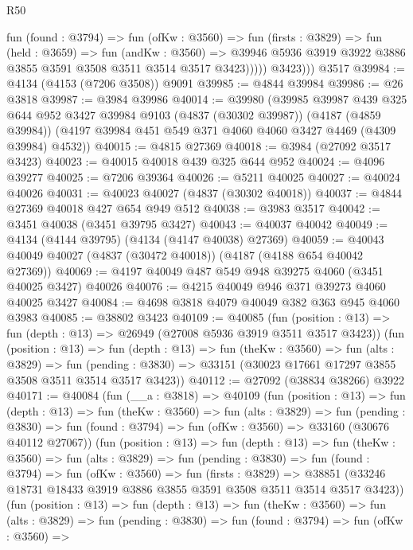 \begin{lexlean}{R50}
\begin{coremodule}
                fun (found : @3794) =>
                fun (ofKw : @3560) =>
                fun (firsts : @3829) =>
                fun (held : @3659) =>
                fun (andKw : @3560) =>
                @39946 @5936 @3919 @3922 @3886 @3855 @3591 @3508 @3511 @3514 @3517 @3423)))))
          @3423)))
    @3517
@39984 := @4134 (@4153 (@7206 @3508)) @9091
@39985 := @4844 @39984
@39986 := @26 @3818
@39987 := @3984 @39986
@40014 := @39980
    (@39985
      @39987
      @439
      @325
      @644
      @952
      @3427
      @39984
      @9103
      (@4837 (@30302 @39987))
      (@4187 (@4859 @39984))
      (@4197 @39984 @451 @549 @371 @4060 @4060 @3427 @4469 (@4309 @39984) @4532))
@40015 := @4815 @27369
@40018 := @3984 (@27092 @3517 @3423)
@40023 := @40015 @40018 @439 @325 @644 @952
@40024 := @4096 @39277
@40025 := @7206 @39364
@40026 := @5211 @40025
@40027 := @40024 @40026
@40031 := @40023 @40027 (@4837 (@30302 @40018))
@40037 := @4844 @27369 @40018 @427 @654 @949 @512
@40038 := @3983 @3517
@40042 := @3451 @40038 (@3451 @39795 @3427)
@40043 := @40037 @40042
@40049 := @4134 (@4144 @39795) (@4134 (@4147 @40038) @27369)
@40059 := @40043 @40049 @40027 (@4837 (@30472 @40018)) (@4187 (@4188 @654 @40042 @27369))
@40069 := @4197 @40049 @487 @549 @948 @39275 @4060 (@3451 @40025 @3427) @40026
@40076 := @4215 @40049 @946 @371 @39273 @4060 @40025 @3427
@40084 := @4698 @3818 @4079 @40049 @382 @363 @945 @4060 @3983
@40085 := @38802 @3423
@40109 := @40085
    (fun (position : @13) => fun (depth : @13) => @26949 (@27008 @5936 @3919 @3511 @3517 @3423))
    (fun (position : @13) =>
    fun (depth : @13) =>
    fun (theKw : @3560) =>
    fun (alts : @3829) =>
    fun (pending : @3830) => @33151 (@30023 @17661 @17297 @3855 @3508 @3511 @3514 @3517 @3423))
@40112 := @27092 (@38834 @38266) @3922
@40171 := @40084
    (fun (__a : @3818) =>
    @40109
      (fun (position : @13) =>
      fun (depth : @13) =>
      fun (theKw : @3560) =>
      fun (alts : @3829) =>
      fun (pending : @3830) =>
      fun (found : @3794) => fun (ofKw : @3560) => @33160 (@30676 @40112 @27067))
      (fun (position : @13) =>
      fun (depth : @13) =>
      fun (theKw : @3560) =>
      fun (alts : @3829) =>
      fun (pending : @3830) =>
      fun (found : @3794) =>
      fun (ofKw : @3560) =>
      fun (firsts : @3829) =>
      @38851 (@33246 @18731 @18433 @3919 @3886 @3855 @3591 @3508 @3511 @3514 @3517 @3423))
      (fun (position : @13) =>
      fun (depth : @13) =>
      fun (theKw : @3560) =>
      fun (alts : @3829) =>
      fun (pending : @3830) =>
      fun (found : @3794) =>
      fun (ofKw : @3560) =>

\end{coremodule}
\end{lexlean}
